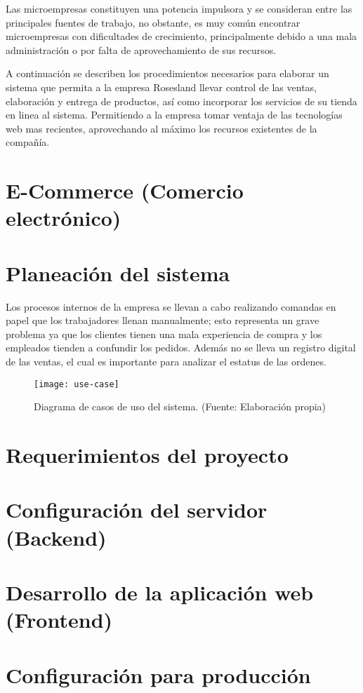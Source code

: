 Las microempresas constituyen una potencia impulsora y se consideran entre las principales fuentes de trabajo, no obstante, es muy común encontrar microempresas con dificultades de crecimiento, principalmente debido a una mala administración o por falta de aprovechamiento de sus recursos.
\vspace{0.8cm}

A continuación se describen los procedimientos necesarios para elaborar un sistema que permita a la empresa Rosesland llevar control de las ventas, elaboración y entrega de productos, así como incorporar los servicios de su tienda en linea al sistema. Permitiendo a la empresa tomar ventaja de las tecnologías web mas recientes, aprovechando al máximo los recursos existentes de la compañía.

\section{E-Commerce (Comercio electrónico)}


\newpage
\section{Planeación del sistema}
Los procesos internos de la empresa se llevan a cabo realizando comandas en papel que los trabajadores llenan manualmente; esto representa un grave problema ya que los clientes tienen una mala experiencia de compra y los empleados tienden a confundir los pedidos. Además no se lleva un registro digital de las ventas, el cual es importante para analizar el estatus de las ordenes. 
\vspace{0.8cm}

\begin{figure}[H]
  \centering
  \texttt{[image: use-case]}
  \caption{Diagrama de casos de uso del sistema. (Fuente: Elaboración propia)}
\end{figure}
\vspace{0.8cm}

\section{Requerimientos del proyecto}


\newpage
\section{Configuración del servidor (Backend)}


\newpage
\section{Desarrollo de la aplicación web (Frontend)}


\newpage
\section{Configuración para producción}
